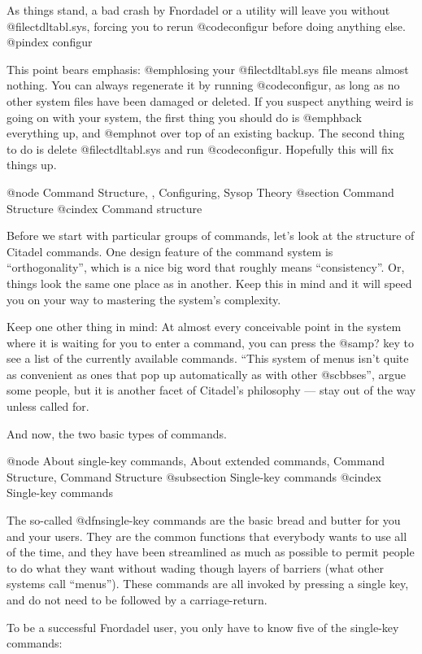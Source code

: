 As things stand, a bad crash by Fnordadel or a
utility will leave you without @file{ctdltabl.sys}, forcing you
to rerun @code{configur} before doing anything else.
@pindex configur

This point bears emphasis: @emph{losing your @file{ctdltabl.sys}
file means almost nothing}.  You can always regenerate it by
running @code{configur}, as long as no other system files have
been damaged or deleted.  If you suspect anything weird is
going on with your system, the first thing you should do is
@emph{back everything up}, and @emph{not} over top of an existing backup.
The second thing to do is delete @file{ctdltabl.sys} and run
@code{configur}.  Hopefully this will fix things up.

@node Command Structure,  , Configuring, Sysop Theory
@section Command Structure
@cindex Command structure

Before we start with particular groups of commands, let's
look at the structure of Citadel commands.  One design
feature of the command system is ``orthogonality'', which is a nice
big word that roughly means ``consistency''.  Or, things look the
same one place as in another.  Keep this in mind and it will speed
you on your way to mastering the system's complexity.

Keep one other thing in mind:  At almost every conceivable
point in the system where it is waiting for you to enter a command,
you can press the @samp{?} key to see a list of the currently available
commands.  ``This system of menus isn't quite as convenient as ones
that pop up automatically as with other @sc{bbs}es'', argue some people,
but it is another facet of Citadel's philosophy --- stay out of the
way unless called for.

And now, the two basic types of commands.

@node About single-key commands, About extended commands, Command Structure, Command Structure
@subsection Single-key commands
@cindex Single-key commands

The so-called @dfn{single-key} commands are the basic
bread and butter for you and your users.  They are the
common functions that everybody wants to use all of the
time, and they have been streamlined as much as possible
to permit people to do what they want without wading though
layers of barriers (what other systems call ``menus'').  These
commands are all invoked by pressing a single key, and do
not need to be followed by a carriage-return.

To be a successful Fnordadel user, you only have
to know five of the single-key commands:

